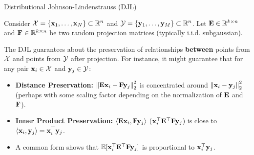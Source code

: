 \documentclass[aspectratio=169]{beamer}
\begin{document}
\begin{frame}{Distributional Johnson-Lindenstrauss (DJL)}

	Consider $\mathcal{X} = \{\mathbf{x}_1, \dots, \mathbf{x}_N\} \subset \mathbb{R}^n$ and
	$\mathcal{Y} = \{\mathbf{y}_1, \dots, \mathbf{y}_M\} \subset \mathbb{R}^n$. Let $\mathbf{E}
	\in \mathbb{R}^{k \times n}$ and $\mathbf{F} \in \mathbb{R}^{k \times n}$ be two random
	projection matrices (typically i.i.d. subgaussian).

	The DJL guarantees about the preservation of relationships \textbf{between}
	points from $\mathcal{X}$ and points from $\mathcal{Y}$ after projection. For instance,
	it might guarantee that for any pair $\mathbf{x}_i \in \mathcal{X}$ and $\mathbf{y}_j
	\in \mathcal{Y}$:
	\begin{itemize}

		\item \textbf{Distance Preservation:}
		      $\left\Vert \mathbf{E}\mathbf{x}_i - \mathbf{F}\mathbf{y}_j \right\Vert_2^2$ is concentrated around $\left\Vert \mathbf{x}_i - \mathbf{y}_j \right\Vert_2^2$ (perhaps with some scaling factor depending on the normalization of $\mathbf{E}$ and $\mathbf{F}$).

		\item \textbf{Inner Product Preservation:}
		      $\left\langle \mathbf{E}\mathbf{x}_i, \mathbf{F}\mathbf{y}_j \right\rangle$ ($\mathbf{x}_i^\top
			      \mathbf{E}^\top \mathbf{F} \mathbf{y}_j$)
		      is close to
		      $\left\langle \mathbf{x}_i, \mathbf{y}_j \right\rangle = \mathbf{x}_i^\top \mathbf{y}_j$.
		\item A common form shows that $\mathbb{E}[\mathbf{x}_i^\top \mathbf{E}^\top
		      \mathbf{F} \mathbf{y}_j]$ is proportional to $\mathbf{x}_i^\top
		      \mathbf{y}_j$.

	\end{itemize}

\end{frame}
\end{document}
